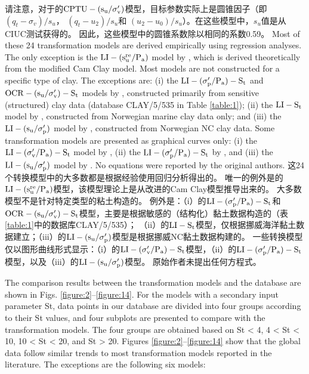 \begin{Parallel}{0.60\textwidth}{}
{        请注意，对于\citet{Ching201252}的$\rm{CPTU}-(s_u/\sigma_v')$模型，目标参数实际上是圆锥因子（即$(q_t-\sigma_v)/s_u$， $(q_t-u_2)/s_u$和 $(u_2-u_0)/s_u$）。在这些模型中，$s_u$值是从CIUC测试获得的。 因此，这些模型中的圆锥系数除以相同的系数0.59。
    }
    \ParallelPar
    \ParallelLText
    {
        Most of these 24 transformation models are derived empirically using regression analyses. The only exception is the $\rm{LI}-(s_u^{re}/P_a)$ model by \citet{Wroth1978137}, which is derived  theoretically from the modified Cam Clay model. Most models are not constructed for a specific type of clay. The exceptions are: (i) the $\rm{LI}-(\sigma_p'/P_a)-S_t$ and $\rm{OCR}-(s_u/\sigma_v')-S_t$ models by \citet{Ching2012522}, constructed primarily from sensitive (structured) clay data (database CLAY/5/535 in Table \ref{table:1}); (ii) the $\rm{LI}-S_t$ model by \citet{Bjerrum195449}, constructed from Norwegian marine clay data only; and (iii) the $\rm{LI}-(s_u/\sigma_p')$ model by \citet{Bjerrum1960711}, constructed from Norwegian NC clay data. Some transformation models are presented as graphical curves only: (i) the $\rm{LI}-(\sigma_v'/P_a)-S_t$ model by \citet{Mitchell1993}, (ii) the $\rm{LI}-(\sigma_p'/P_a)-S_t$ by \citet{NAVFAC1982}, and (iii) the $\rm{LI}-(s_u/\sigma_p')$ model by \citet{Bjerrum1960711}. No equations were reported by the original authors.
    }
    \ParallelRText
    {
        这24个转换模型中的大多数都是根据经验使用回归分析得出的。 唯一的例外是\citet{Wroth1978137}的$\rm{LI}-(s_u^{re}/P_a)$模型，该模型理论上是从改进的Cam Clay模型推导出来的。 大多数模型不是针对特定类型的粘土构造的。 例外是：（i）\citet{Ching2012522}的$\rm{LI}-(\sigma_p'/P_a)-S_t$和$\rm{OCR}-(s_u/\sigma_v')-S_t$模型，主要是根据敏感的（结构化）黏土数据构造的（表\ref{table:1}中的数据库CLAY/5/535）； （ii）\citet{Bjerrum195449}的$\rm{LI}-S_t$模型，仅根据挪威海洋黏土数据建立；（iii）\citet{Bjerrum1960711}的$\rm{LI}-(s_u/\sigma_p')$模型是根据挪威NC黏土数据构建的。 一些转换模型仅以图形曲线形式显示：（i）\citet{Mitchell1993}的$\rm{LI}-(\sigma_v'/P_a)-S_t$模型，（ii）\citet{NAVFAC1982}的$\rm{LI}-(\sigma_p'/P_a)-S_t$模型，以及（iii）\citet{Bjerrum1960711}的$\rm{LI}-(s_u/\sigma_p')$模型。 原始作者未提出任何方程式。
    }
    \ParallelPar
    
    \ParallelLText
    {
        The comparison results between the transformation models and the database are shown in Figs. \ref{figure:2}–\ref{figure:14}. For the models with a secondary input parameter St, data points in our database are divided into four groups according to their St values, and four subplots are presented to compare with the transformation models. The four groups are obtained based on St < 4, 4 < St < 10, 10 < St < 20, and St > 20. Figures \ref{figure:2}–\ref{figure:14} show that the global data follow similar trends to most transformation models reported in the literature. The exceptions are the following six models:

}
\end{Parallel}
